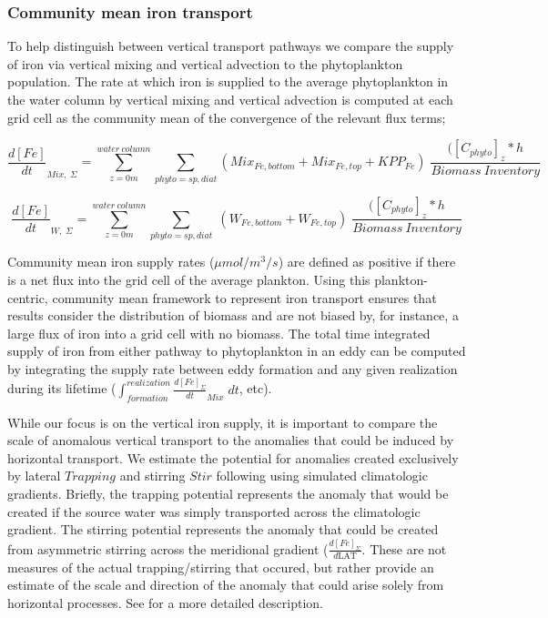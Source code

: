 \documentclass{article}
\begin{document}
\subsubsection{Community mean iron transport}

To help distinguish between vertical transport pathways we compare the supply of iron via vertical mixing and vertical advection to the phytoplankton population. The rate at which iron is supplied to the average phytoplankton in the water column by vertical mixing and vertical advection is computed at each grid cell as the community mean of the convergence of the relevant flux terms;


\begin{equation}
    \frac{d[Fe]}{dt}_{Mix, \; \Sigma} = \sum_{z=0m}^{water \ column} \sum_{phyto = sp, diat} (Mix_{Fe,bottom} + Mix_{Fe,top} + KPP_{Fe}) \; \frac{([C_{phyto}]_z*h}{Biomass \ Inventory }
\end{equation}

\begin{equation}
    \frac{d[Fe]}{dt}_{W, \; \Sigma} = \sum_{z=0m}^{water \ column} \sum_{phyto = sp, diat} \; (W_{Fe,bottom} + W_{Fe,top}) \; \frac{([C_{phyto}]_z*h}{Biomass \ Inventory }
\end{equation}

Community mean iron supply rates ($\mu mol/m^3/s$) are defined as positive if there is a net flux into the grid cell of the average plankton. Using this plankton-centric, community mean framework to represent iron transport ensures that results consider the distribution of biomass and are not biased by, for instance, a large flux of iron into a grid cell with no biomass. The total time integrated supply of iron from either pathway to phytoplankton in an eddy can be computed by integrating the supply rate between eddy formation and any given realization during its lifetime ($\int_{formation}^{realization} \frac{d[Fe]_\Sigma}{dt}_{Mix} \; dt$, etc). 

While our focus is on the vertical iron supply, it is important to compare the scale of anomalous vertical transport to the anomalies that could be induced by horizontal transport. We estimate the potential for anomalies created exclusively by lateral $Trapping$ and stirring $Stir$ following \textcite{FrengerImprintSouthernOcean2018} using simulated climatologic gradients. Briefly, the trapping potential represents the anomaly that would be created if the source water was simply transported across the climatologic gradient. The stirring potential represents the anomaly that could be created from asymmetric stirring across the meridional gradient ($\frac{d[Fe]_\Sigma}{d\textrm{LAT}}$. These are not measures of the actual trapping/stirring that occured, but rather provide an estimate of the scale and direction of the anomaly that could arise solely from horizontal processes.  See \textcite{FrengerImprintSouthernOcean2018} for a more detailed description. 
\end{document}
